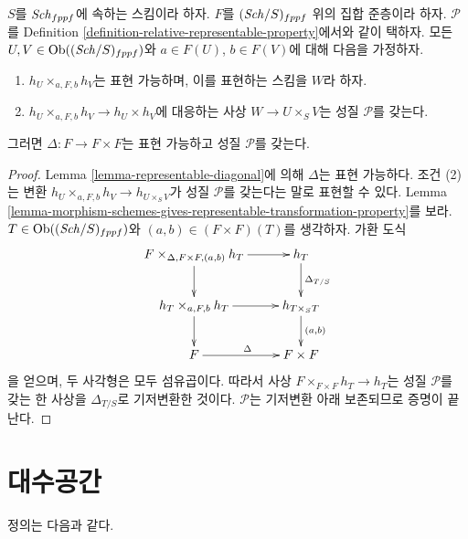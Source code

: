 \begin{lemma}
\label{lemma-transformation-diagonal-properties}
$S$를 $\mathit{Sch}_{fppf}$에 속하는 스킴이라 하자.
$F$를 $(\mathit{Sch}/S)_{fppf}$ 위의 집합 준층이라 하자.
$\mathcal{P}$를 Definition
\ref{definition-relative-representable-property}에서와 같이 택하자.
모든 $U, V \in \mathop{\mathrm{Ob}}\nolimits((\mathit{Sch}/S)_{fppf})$와 $a \in F(U)$,
$b \in F(V)$에 대해 다음을 가정하자.
\begin{enumerate}
\item $h_U \times_{a, F, b} h_V$는 표현 가능하며, 이를 표현하는 스킴을
$W$라 하자.
\item $h_U \times_{a, F, b} h_V \to h_U \times h_V$에 대응하는 사상
$W \to U \times_S V$는 성질 $\mathcal{P}$를 갖는다.
\end{enumerate}
그러면 $\Delta : F \to F \times F$는 표현 가능하고
성질 $\mathcal{P}$를 갖는다.
\end{lemma}

\begin{proof}
Lemma \ref{lemma-representable-diagonal}에 의해 $\Delta$는 표현 가능하다.
조건 (2)는 변환
$h_U \times_{a, F, b} h_V \to h_{U \times_S V}$가
성질 $\mathcal{P}$를 갖는다는 말로 표현할 수 있다. Lemma
\ref{lemma-morphism-schemes-gives-representable-transformation-property}를
보라. $T \in \mathop{\mathrm{Ob}}\nolimits((\mathit{Sch}/S)_{fppf})$와
$(a, b) \in (F \times F)(T)$를 생각하자. 가환 도식
$$
\xymatrix{
F \times_{\Delta, F \times F, (a, b)} h_T \ar[d] \ar[r] &
h_T \ar[d]^{\Delta_{T/S}} \\
h_T \times_{a, F, b} h_T \ar[r] \ar[d] &
h_{T \times_S T} \ar[d]^{(a, b)} \\
F \ar[r]^\Delta & F \times F
}
$$
을 얻으며, 두 사각형은 모두 섬유곱이다. 따라서 사상
$F \times_{F \times F} h_T \to h_T$는 성질 $\mathcal{P}$를 갖는
한 사상을 $\Delta_{T/S}$로 기저변환한 것이다. $\mathcal{P}$는
기저변환 아래 보존되므로 증명이 끝난다.
\end{proof}


















\section{대수공간}
\label{section-algebraic-spaces}

\noindent
정의는 다음과 같다.

